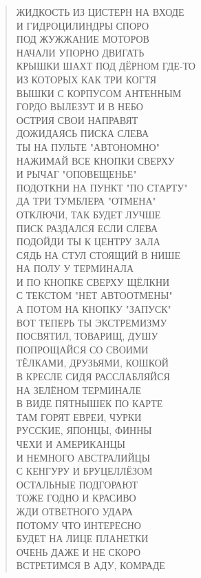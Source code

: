 \begin{verse}
ЖИДКОСТЬ ИЗ ЦИСТЕРН НА ВХОДЕ\\
И ГИДРОЦИЛИНДРЫ СПОРО\\
ПОД ЖУЖЖАНИЕ МОТОРОВ \\
НАЧАЛИ УПОРНО ДВИГАТЬ \\
КРЫШКИ ШАХТ ПОД ДЁРНОМ ГДЕ-ТО\\
ИЗ КОТОРЫХ КАК ТРИ КОГТЯ\\
ВЫШКИ С КОРПУСОМ АНТЕННЫМ\\
ГОРДО ВЫЛЕЗУТ И В НЕБО\\
ОСТРИЯ СВОИ НАПРАВЯТ\\
ДОЖИДАЯСЬ ПИСКА СЛЕВА\\
ТЫ НА ПУЛЬТЕ "АВТОНОМНО"\\
НАЖИМАЙ ВСЕ КНОПКИ СВЕРХУ\\
И РЫЧАГ "ОПОВЕЩЕНЬЕ" \\
ПОДОТКНИ НА ПУНКТ "ПО СТАРТУ"\\
ДА ТРИ ТУМБЛЕРА "ОТМЕНА" \\
ОТКЛЮЧИ, ТАК БУДЕТ ЛУЧШЕ\\
ПИСК РАЗДАЛСЯ ЕСЛИ СЛЕВА\\
ПОДОЙДИ ТЫ К ЦЕНТРУ ЗАЛА\\
СЯДЬ НА СТУЛ СТОЯЩИЙ В НИШЕ\\
НА ПОЛУ У ТЕРМИНАЛА\\
И ПО КНОПКЕ СВЕРХУ ЩЁЛКНИ\\
С ТЕКСТОМ "НЕТ АВТООТМЕНЫ"\\
А ПОТОМ НА КНОПКУ "ЗАПУСК"\\
ВОТ ТЕПЕРЬ ТЫ ЭКСТРЕМИЗМУ\\
ПОСВЯТИЛ, ТОВАРИЩ, ДУШУ\\
ПОПРОЩАЙСЯ СО СВОИМИ\\
ТЁЛКАМИ, ДРУЗЬЯМИ, КОШКОЙ\\
В КРЕСЛЕ СИДЯ РАССЛАБЛЯЙСЯ\\
НА ЗЕЛЁНОМ ТЕРМИНАЛЕ\\
В ВИДЕ ПЯТНЫШЕК ПО КАРТЕ \\
ТАМ ГОРЯТ ЕВРЕИ, ЧУРКИ\\
РУССКИЕ, ЯПОНЦЫ, ФИННЫ\\
ЧЕХИ И АМЕРИКАНЦЫ\\
И НЕМНОГО АВСТРАЛИЙЦЫ\\
С КЕНГУРУ И БРУЦЕЛЛЁЗОМ\\
ОСТАЛЬНЫЕ ПОДГОРАЮТ\\
ТОЖЕ ГОДНО И КРАСИВО\\
ЖДИ ОТВЕТНОГО УДАРА\\
ПОТОМУ ЧТО ИНТЕРЕСНО\\
БУДЕТ НА ЛИЦЕ ПЛАНЕТКИ\\
ОЧЕНЬ ДАЖЕ И НЕ СКОРО\\
ВСТРЕТИМСЯ В АДУ, КОМРАДЕ
\end{verse}

